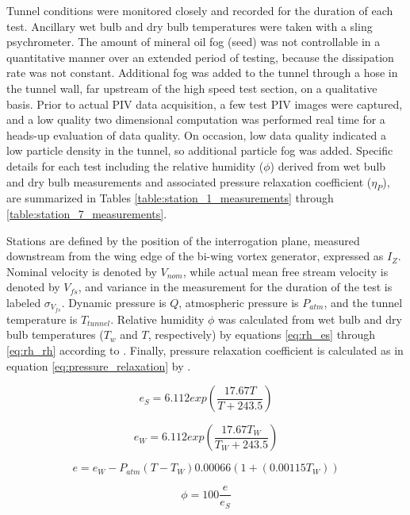 Tunnel conditions were monitored closely and recorded for the duration of each 
test. Ancillary wet bulb and dry bulb temperatures were taken with a sling 
psychrometer. The amount of mineral oil fog (seed) was not controllable in a 
quantitative manner over an extended period of testing, because the dissipation 
rate was not constant. Additional fog was added to the tunnel through a hose in 
the tunnel wall, far upstream of the high speed test section, on a qualitative 
basis. Prior to actual PIV data acquisition, a few test PIV images 
were captured, and a low quality two dimensional computation was performed real 
time for a heads-up evaluation of data quality. 
On occasion, low data quality indicated a low particle density in the tunnel, 
so additional particle fog was added. 
Specific details for each test including the relative humidity ($\phi$) derived 
from wet bulb and dry bulb measurements and associated pressure relaxation 
coefficient 
($\eta_P$), are summarized in Tables \ref{table:station_1_measurements} through 
\ref{table:station_7_measurements}. 

Stations are defined by the position of the interrogation plane, measured 
downstream from the wing edge of the bi-wing vortex generator, expressed as
$I_Z$. Nominal velocity is denoted by $V_{nom}$, while actual mean free stream 
velocity is denoted by $V_{fs}$, and variance in the measurement for the 
duration of the test is labeled $\sigma_{V_{fs}}$. Dynamic pressure is $Q$, 
atmospheric 
pressure is $P_{atm}$, and the tunnel temperature is $T_{tunnel}$. Relative 
humidity $\phi$ was calculated from wet bulb and dry bulb temperatures ($T_w$ 
and $T$, respectively) by 
equations \ref{eq:rh_es} through \ref{eq:rh_rh} according to \cite{owen1977}. 
Finally, pressure relaxation coefficient is calculated as in equation 
\ref{eq:pressure_relaxation} by \cite{ash2011}.

\begin{equation}
e_S = 6.112 exp \left( \frac{17.67 T}{T + 243.5} \right)
\label{eq:rh_es}
\end{equation}

\begin{equation}
e_W = 6.112 exp \left( \frac{17.67 T_W}{T_W + 243.5} \right)
\label{eq:rh_ew}
\end{equation}

\begin{equation}
e = e_W - P_{atm} (T - T_W) 0.00066(1 +( 0.00115T_W))
\label{eq:rh_e}
\end{equation}

\begin{equation}
\phi = 100 \frac{e}{e_S}
\label{eq:rh_rh}
\end{equation}











